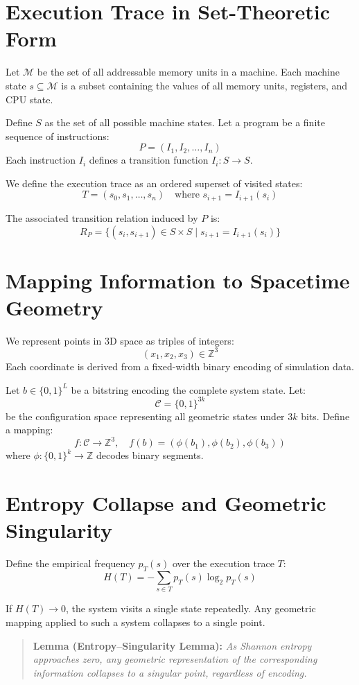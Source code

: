 \documentclass[11pt]{article}
\begin{document}
\section{Execution Trace in Set-Theoretic Form}

Let $\mathcal{M}$ be the set of all addressable memory units in a machine. Each machine state $s \subseteq \mathcal{M}$ is a subset containing the values of all memory units, registers, and CPU state.

Define $S$ as the set of all possible machine states. Let a program be a finite sequence of instructions:
\[
P = (I_1, I_2, \dots, I_n)
\]
Each instruction $I_i$ defines a transition function $I_i : S \to S$.

We define the execution trace as an ordered superset of visited states:
\[
T = (s_0, s_1, \dots, s_n) \quad \text{where } s_{i+1} = I_{i+1}(s_i)
\]

The associated transition relation induced by $P$ is:
\[
R_P = \{ (s_i, s_{i+1}) \in S \times S \mid s_{i+1} = I_{i+1}(s_i) \}
\]

\section{Mapping Information to Spacetime Geometry}

We represent points in 3D space as triples of integers:
\[
(x_1, x_2, x_3) \in \mathbb{Z}^3
\]
Each coordinate is derived from a fixed-width binary encoding of simulation data.

Let $b \in \{0,1\}^L$ be a bitstring encoding the complete system state. Let:
\[
\mathcal{C} = \{0,1\}^{3k}
\]
be the configuration space representing all geometric states under $3k$ bits. Define a mapping:
\[
f : \mathcal{C} \to \mathbb{Z}^3, \quad f(b) = (\phi(b_1), \phi(b_2), \phi(b_3))
\]
where $\phi : \{0,1\}^k \to \mathbb{Z}$ decodes binary segments.

\section{Entropy Collapse and Geometric Singularity}

Define the empirical frequency $p_T(s)$ over the execution trace $T$:
\[
H(T) = -\sum_{s \in T} p_T(s) \log_2 p_T(s)
\]

If $H(T) \to 0$, the system visits a single state repeatedly. Any geometric mapping applied to such a system collapses to a single point.

\begin{quote}
\textbf{Lemma (Entropy--Singularity Lemma):} 
\emph{As Shannon entropy approaches zero, any geometric representation of the corresponding information collapses to a singular point, regardless of encoding.}
\end{quote}
\end{document}
